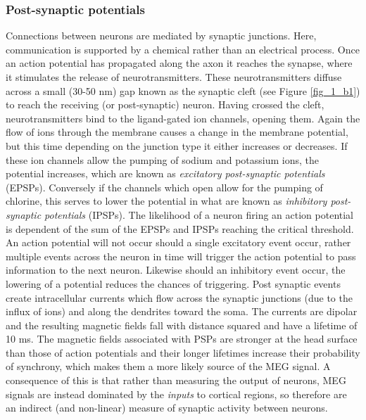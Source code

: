 \subsubsection{Post-synaptic potentials}
Connections between neurons are mediated by synaptic junctions. Here, communication is supported by a chemical rather than an electrical process. Once an action potential has propagated along the axon it reaches the synapse, where it stimulates the release of neurotransmitters. These neurotransmitters diffuse across a small (30-50 nm) gap known as the synaptic cleft (see Figure \ref{fig_1_b1}) to reach the receiving (or post-synaptic) neuron. Having crossed the cleft, neurotransmitters bind to the ligand-gated ion channels, opening them. Again the flow of ions through the membrane causes a change in the membrane potential, but this time depending on the junction type it either increases or decreases. If these ion channels allow the pumping of sodium and potassium ions, the potential increases, which are known as \textit{excitatory post-synaptic potentials} (EPSPs). Conversely if the channels which open allow for the pumping of chlorine, this serves to lower the potential in what are known as \textit{inhibitory post-synaptic potentials} (IPSPs). The likelihood of a neuron firing an action potential is dependent of the sum of the EPSPs and IPSPs reaching the critical threshold. An action potential will not occur should a single excitatory event occur, rather multiple events across the neuron in time will trigger the action potential to pass information to the next neuron. Likewise should an inhibitory event occur, the lowering of a potential reduces the chances of triggering. Post synaptic events create intracellular currents which flow across the synaptic junctions (due to the influx of ions) and along the dendrites toward the soma. The currents are dipolar and the resulting magnetic fields fall with distance squared and have a lifetime of 10 ms. The magnetic fields associated with PSPs are stronger at the head surface than those of action potentials and their longer lifetimes increase their probability of synchrony, which makes them a more likely source of the MEG signal. A consequence of this is that rather than measuring the output of neurons, MEG signals are instead dominated by the \textit{inputs} to cortical regions, so therefore are an indirect (and non-linear) measure of synaptic activity between neurons. 

